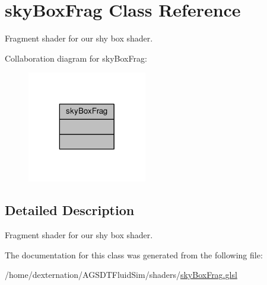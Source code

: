 \hypertarget{classsky_box_frag}{\section{sky\-Box\-Frag Class Reference}
\label{classsky_box_frag}
}


Fragment shader for our shy box shader.  




Collaboration diagram for sky\-Box\-Frag\-:\nopagebreak
\begin{figure}[H]
\begin{center}
\leavevmode
\includegraphics[width=148pt]{classsky_box_frag__coll__graph}
\end{center}
\end{figure}


\subsection{Detailed Description}
Fragment shader for our shy box shader. 

The documentation for this class was generated from the following file\-:\begin{DoxyCompactItemize}
\item 
/home/dexternation/\-A\-G\-S\-D\-T\-Fluid\-Sim/shaders/\hyperlink{sky_box_frag_8glsl}{sky\-Box\-Frag.\-glsl}\end{DoxyCompactItemize}
